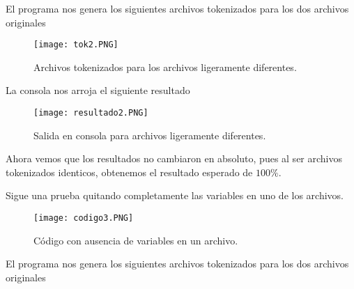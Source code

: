 \documentclass[12pt,twoside]{article}
\begin{document}
El programa nos genera los siguientes archivos tokenizados para los dos archivos originales

\vspace{5mm} %

\vspace{0cm}

\begin{figure}[htb]
\centering
\texttt{[image: tok2.PNG]}
\caption{Archivos tokenizados para los archivos ligeramente diferentes.}
\end{figure}

\vspace{0cm}

\newpage

La consola nos arroja el siguiente resultado

\vspace{0cm}

\begin{figure}[htb]
\centering
\texttt{[image: resultado2.PNG]}
\caption{Salida en consola para archivos ligeramente diferentes.}
\end{figure}

\vspace{0cm}

Ahora vemos que los resultados no cambiaron en absoluto, pues al ser archivos tokenizados identicos, obtenemos el resultado esperado de $100\%$. 

\vspace{5mm}

Sigue una prueba quitando completamente las variables en uno de los archivos.

\vspace{0cm}

\begin{figure}[htb]
\centering
\texttt{[image: codigo3.PNG]}
\caption{C\'odigo con ausencia de variables en un archivo.}
\end{figure}

\vspace{0cm}

\vspace{5mm} %

\newpage

El programa nos genera los siguientes archivos tokenizados para los dos archivos originales

\vspace{5mm} %
\end{document}
